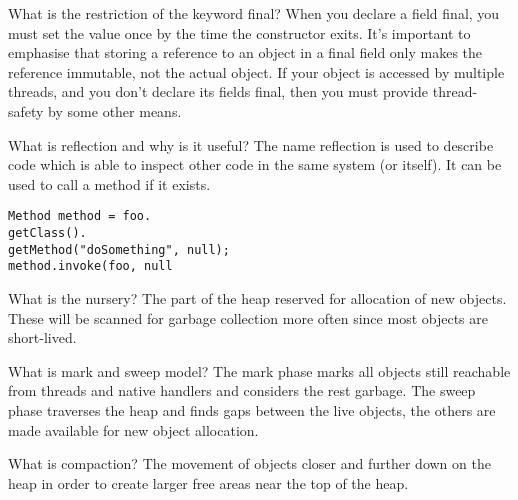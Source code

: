 \documentclass[avery5371,grid]{flashcards}
\begin{document}
\begin{flashcard}[Concurrency]{What is the restriction of the keyword final?}
When you declare a field final, you must set the value once by the time the constructor exits. It's important to emphasise that storing a reference to an object in a final field only makes the reference immutable, not the actual object. If your object is accessed by multiple threads, and you don't declare its fields final, then you must provide thread-safety by some other means.
\end{flashcard}

\begin{flashcard}[Lang]{What is reflection and why is it useful?}
The name reflection is used to describe code which is able to inspect other code in the same system (or itself).
It can be used to call a method if it exists.
\begin{lstlisting}[frame=single]
Method method = foo.
getClass().
getMethod("doSomething", null);
method.invoke(foo, null
\end{lstlisting}
\end{flashcard}

\begin{flashcard}[Memory]{What is the nursery?}
The part of the heap reserved for allocation of new objects. These will be scanned for garbage collection more often since most objects are short-lived.
\end{flashcard}

\begin{flashcard}[Memory]{What is mark and sweep model?}
The mark phase marks all objects still reachable from threads and native handlers and considers the rest garbage. The sweep phase traverses the heap and finds gaps between the live objects, the others are made available for new object allocation.
\end{flashcard}

\begin{flashcard}[Memory]{What is compaction?}
The movement of objects closer and further down on the heap in order to create larger free areas near the top of the heap.
\end{flashcard}
\end{document}
